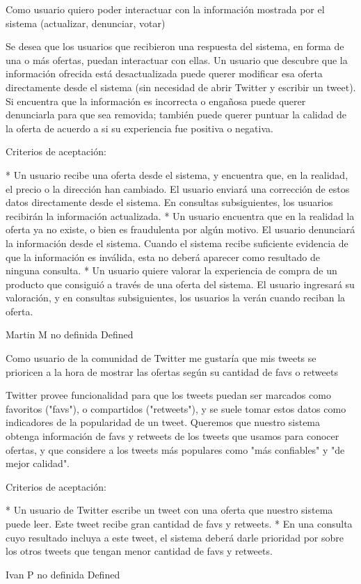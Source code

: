 	{Como usuario quiero poder interactuar con la información mostrada por el sistema (actualizar, denunciar, votar)} %
	{Se desea que los usuarios que recibieron una respuesta del sistema, en forma
de una o más ofertas, puedan interactuar con ellas. Un usuario que descubre
que la información ofrecida está desactualizada puede querer modificar esa
oferta directamente desde el sistema (sin necesidad de abrir Twitter y
escribir un tweet). Si encuentra que la información es incorrecta o engañosa
puede querer denunciarla para que sea removida; también puede querer puntuar
la calidad de la oferta de acuerdo a si su experiencia fue positiva o
negativa.

  
Criterios de aceptación:

* Un usuario recibe una oferta desde el sistema, y encuentra que, en la realidad, el precio o la dirección han cambiado. El usuario enviará una corrección de estos datos directamente desde el sistema. En consultas subsiguientes, los usuarios recibirán la información actualizada.  
* Un usuario encuentra que en la realidad la oferta ya no existe, o bien es fraudulenta por algún motivo. El usuario denunciará la información desde el sistema. Cuando el sistema recibe suficiente evidencia de que la información es inválida, esta no deberá aparecer como resultado de ninguna consulta.  
* Un usuario quiere valorar la experiencia de compra de un producto que consiguió a través de una oferta del sistema. El usuario ingresará su valoración, y en consultas subsiguientes, los usuarios la verán cuando reciban la oferta.

} %
	{} %
	{} %
	{Martin M} %
	{no definida} %
	{Defined} %


\vspace{20pt}

	{Como usuario de la comunidad de Twitter me gustaría que mis tweets se prioricen a la hora de mostrar las ofertas según su cantidad de favs o retweets} %
	{Twitter provee funcionalidad para que los tweets puedan ser marcados como
favoritos ("favs"), o compartidos ("retweets"), y se suele tomar estos datos
como indicadores de la popularidad de un tweet. Queremos que nuestro sistema
obtenga información de favs y retweets de los tweets que usamos para conocer
ofertas, y que considere a los tweets más populares como "más confiables" y
"de mejor calidad".

  
Criterios de aceptación:

* Un usuario de Twitter escribe un tweet con una oferta que nuestro sistema puede leer. Este tweet recibe gran cantidad de favs y retweets.  
* En una consulta cuyo resultado incluya a este tweet, el sistema deberá darle prioridad por sobre los otros tweets que tengan menor cantidad de favs y retweets.

} %
	{} %
	{} %
	{Ivan P} %
	{no definida} %
	{Defined} %



